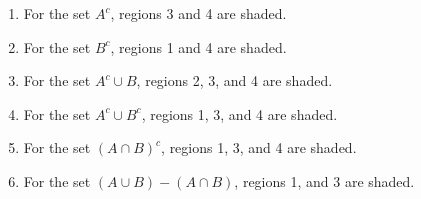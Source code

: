 \documentclass[11pt]{article}
\begin{document}
\begin{enumerate}
  \item For the set $A^c$, regions 3 and 4 are shaded.
  \item For the set $B^c$, regions 1 and 4 are shaded.
  \item For the set $A^c \cup B$, regions 2, 3, and 4 are shaded.
  \item For the set $A^c \cup B^c$, regions 1, 3, and 4 are shaded.
  \item For the set $(A \cap B)^c$, regions 1, 3, and 4 are shaded.
  \item For the set $(A \cup B) - (A \cap B)$, regions 1, and 3 are shaded.
\end{enumerate}
\hbreak
\end{document}
